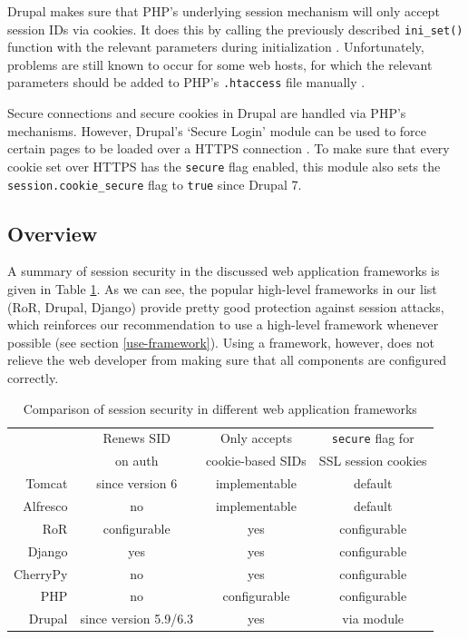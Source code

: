 Drupal makes sure that PHP's underlying session mechanism will only accept session IDs via cookies. It does this by calling the previously described \texttt{ini\_set()} function with the relevant parameters during initialization \cite{DrupalSettings}. Unfortunately, problems are still known to occur for some web hosts, for which the relevant parameters should be added to PHP's \texttt{.htaccess} file manually \cite{DrupalSIDurl}.

Secure connections and secure cookies in Drupal are handled via PHP's mechanisms. However, Drupal's `Secure Login' module can be used to force certain pages to be loaded over a HTTPS connection \cite{DrupalSecureLogin}. To make sure that every cookie set over HTTPS has the \texttt{secure} flag enabled, this module also sets the \texttt{session.cookie\_secure} flag to \texttt{true} since Drupal 7.

\subsection{Overview}

A summary of session security in the discussed web application frameworks is given in Table \ref{tab:frameworks}. As we can see, the popular high-level frameworks in our list (RoR, Drupal, Django) provide pretty good protection against session attacks, which reinforces our recommendation to use a high-level framework whenever possible (see section \ref{use-framework}). Using a framework, however, does not relieve the web developer from making sure that all components are configured correctly.

\begin{table}[htb]
	\centering
	\begin{tabular}{r|ccc}
		& Renews SID & Only accepts & \texttt{secure} flag for\\
		& on auth & cookie-based SIDs & SSL session cookies\\
		\hline
		Tomcat & since version 6 & implementable & default\\
		Alfresco & no & implementable & default\\
		RoR & configurable & yes & configurable\\
		Django & yes & yes & configurable\\
		CherryPy & no & yes & configurable\\
		PHP & no & configurable & configurable\\
		Drupal & since version 5.9/6.3 & yes & via module\\
	\end{tabular}
	\caption{Comparison of session security in different web application frameworks}
	\label{tab:frameworks}
\end{table}


